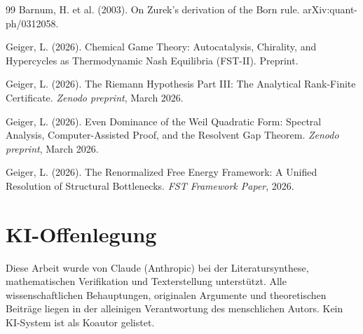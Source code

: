 \documentclass[12pt,a4paper]{article}
\theoremstyle{remark}
\begin{document}
\begin{thebibliography}{99}
Barnum, H. et al. (2003).
\newblock On Zurek's derivation of the Born rule.
\newblock arXiv:quant-ph/0312058.

Geiger, L. (2026).
\newblock Chemical Game Theory: Autocatalysis, Chirality, and Hypercycles as Thermodynamic Nash Equilibria (FST-II).
\newblock Preprint.

Geiger, L. (2026).
\newblock The Riemann Hypothesis Part III: The Analytical Rank-Finite Certificate.
\newblock \textit{Zenodo preprint}, March 2026.

Geiger, L. (2026).
\newblock Even Dominance of the Weil Quadratic Form: Spectral Analysis, Computer-Assisted Proof, and the Resolvent Gap Theorem.
\newblock \textit{Zenodo preprint}, March 2026.

Geiger, L. (2026).
\newblock The Renormalized Free Energy Framework: A Unified Resolution of Structural Bottlenecks.
\newblock \textit{FST Framework Paper}, 2026.

\end{thebibliography}

\section*{KI-Offenlegung}
Diese Arbeit wurde von Claude (Anthropic) bei der Literatursynthese, mathematischen Verifikation und Texterstellung unterst\"utzt. Alle wissenschaftlichen Behauptungen, originalen Argumente und theoretischen Beitr\"age liegen in der alleinigen Verantwortung des menschlichen Autors. Kein KI-System ist als Koautor gelistet.
\end{document}
